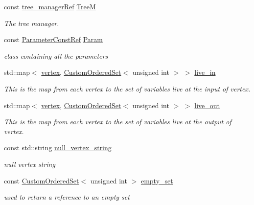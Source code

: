 \begin{DoxyCompactItemize}
\item 
const \hyperlink{tree__manager_8hpp_a96ff150c071ce11a9a7a1e40590f205e}{tree\+\_\+manager\+Ref} \hyperlink{classliveness_a834e4f8d2f7fc3097ed3abb2e941dc62}{TreeM}
\begin{DoxyCompactList}\small\item\em The tree manager. \end{DoxyCompactList}\item 
const \hyperlink{Parameter_8hpp_a37841774a6fcb479b597fdf8955eb4ea}{Parameter\+Const\+Ref} \hyperlink{classliveness_a2b88b050331ff347cbb910b885cff259}{Param}
\begin{DoxyCompactList}\small\item\em class containing all the parameters \end{DoxyCompactList}\item 
std\+::map$<$ \hyperlink{graph_8hpp_abefdcf0544e601805af44eca032cca14}{vertex}, \hyperlink{classCustomOrderedSet}{Custom\+Ordered\+Set}$<$ unsigned int $>$ $>$ \hyperlink{classliveness_a75ba4b82410bc9747fcdb44f6b313f00}{live\+\_\+in}
\begin{DoxyCompactList}\small\item\em This is the map from each vertex to the set of variables live at the input of vertex. \end{DoxyCompactList}\item 
std\+::map$<$ \hyperlink{graph_8hpp_abefdcf0544e601805af44eca032cca14}{vertex}, \hyperlink{classCustomOrderedSet}{Custom\+Ordered\+Set}$<$ unsigned int $>$ $>$ \hyperlink{classliveness_adbc38597d5850581947517fbf25d6354}{live\+\_\+out}
\begin{DoxyCompactList}\small\item\em This is the map from each vertex to the set of variables live at the output of vertex. \end{DoxyCompactList}\item 
const std\+::string \hyperlink{classliveness_a02ac2fe52cfae579f3114eee285a7500}{null\+\_\+vertex\+\_\+string}
\begin{DoxyCompactList}\small\item\em null vertex string \end{DoxyCompactList}\item 
const \hyperlink{classCustomOrderedSet}{Custom\+Ordered\+Set}$<$ unsigned int $>$ \hyperlink{classliveness_a450df2b0f6676fe3bb9eb4950bf606b4}{empty\+\_\+set}
\begin{DoxyCompactList}\small\item\em used to return a reference to an empty set \end{DoxyCompactList}\item 

\end{DoxyCompactItemize}
